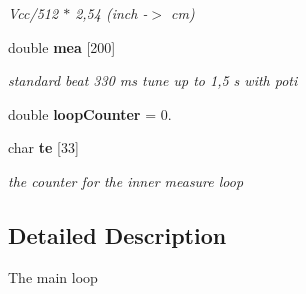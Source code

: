 \begin{DoxyCompactItemize}
\begin{DoxyCompactList}\small\item\em \-Vcc/512 $\ast$ 2,54 (inch -\/$>$ cm) \end{DoxyCompactList}\item 
double {\bf mea} [200]\label{group__main_ga4bd78858057f77134858778f80f12f48}

\begin{DoxyCompactList}\small\item\em standard beat 330 ms tune up to 1,5 s with poti \end{DoxyCompactList}\item 
double {\bfseries loop\-Counter} = 0.\label{group__main_gad08068c1a902b6de5c7ff899e3a731fa}

\item 
char {\bf te} [33]\label{group__main_ga46b9c288b9e05a095968531ed38f9877}

\begin{DoxyCompactList}\small\item\em the counter for the inner measure loop \end{DoxyCompactList}\end{DoxyCompactItemize}


\subsection{\-Detailed \-Description}
\-The main loop 